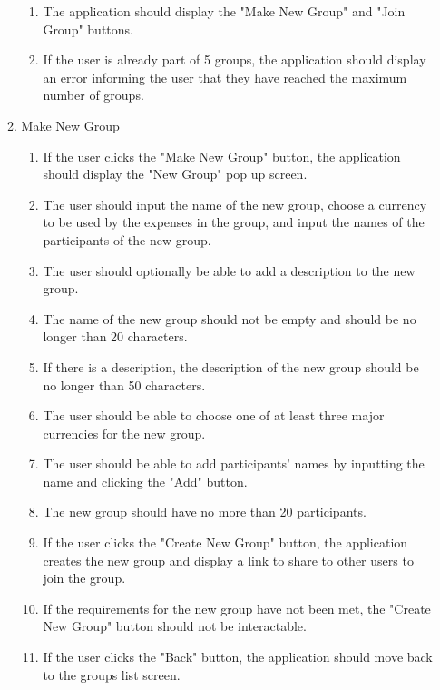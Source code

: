 \documentclass[conference]{IEEEtran}
\begin{document}
\begin{enumerate}
\begin{enumerate}
\begin{enumerate}
                        \item The application should display the "Make New Group" and "Join Group" buttons.
                        \item If the user is already part of 5 groups, the application should display an error informing the user that they have reached the maximum number of groups.
                    \end{enumerate}
                \item Make New Group
                    \begin{enumerate}
                        \item If the user clicks the "Make New Group" button, the application should display the "New Group" pop up screen.
                        \item The user should input the name of the new group, choose a currency to be used by the expenses in the group, and input the names of the participants of the new group.
                        \item The user should optionally be able to add a description to the new group.
                        \item The name of the new group should not be empty and should be no longer than 20 characters.
                        \item If there is a description, the description of the new group should be no longer than 50 characters.
                        \item The user should be able to choose one of at least three major currencies for the new group.
                        \item The user should be able to add participants' names by inputting the name and clicking the "Add" button.
                        \item The new group should have no more than 20 participants.
                        \item If the user clicks the "Create New Group" button, the application creates the new group and display a link to share to other users to join the group.
                        \item If the requirements for the new group have not been met, the "Create New Group" button should not be interactable.
                        \item If the user clicks the "Back" button, the application should move back to the groups list screen.
                    \end{enumerate}

\end{enumerate}
\end{enumerate}
\end{document}
